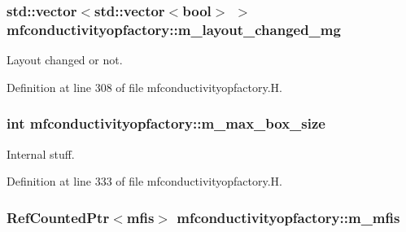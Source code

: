 \subsubsection[{\texorpdfstring{m\+\_\+layout\+\_\+changed\+\_\+mg}{m_layout_changed_mg}}]{\setlength{\rightskip}{0pt plus 5cm}std\+::vector$<$std\+::vector$<$bool$>$ $>$ mfconductivityopfactory\+::m\+\_\+layout\+\_\+changed\+\_\+mg\hspace{0.3cm}{\ttfamily [protected]}}\hypertarget{classmfconductivityopfactory_ae4a3a643e4551d5bf5e5b6edf094b4ea}{}\label{classmfconductivityopfactory_ae4a3a643e4551d5bf5e5b6edf094b4ea}


Layout changed or not. 



Definition at line 308 of file mfconductivityopfactory.\+H.

\subsubsection[{\texorpdfstring{m\+\_\+max\+\_\+box\+\_\+size}{m_max_box_size}}]{\setlength{\rightskip}{0pt plus 5cm}int mfconductivityopfactory\+::m\+\_\+max\+\_\+box\+\_\+size\hspace{0.3cm}{\ttfamily [protected]}}\hypertarget{classmfconductivityopfactory_a5e158eddbea0612dcd1521f49b4afedd}{}\label{classmfconductivityopfactory_a5e158eddbea0612dcd1521f49b4afedd}


Internal stuff. 



Definition at line 333 of file mfconductivityopfactory.\+H.

\subsubsection[{\texorpdfstring{m\+\_\+mfis}{m_mfis}}]{\setlength{\rightskip}{0pt plus 5cm}Ref\+Counted\+Ptr$<${\bf mfis}$>$ mfconductivityopfactory\+::m\+\_\+mfis\hspace{0.3cm}{\ttfamily [protected]}}\hypertarget{classmfconductivityopfactory_a3eb6f6794d4d44c3cb35b925752873a6}{}\label{classmfconductivityopfactory_a3eb6f6794d4d44c3cb35b925752873a6}


